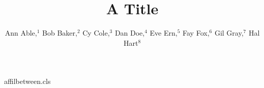 \begin{filecontents*}[overwrite]{affilbetween.cls}
\def\affilfont{\small}
\def\affil#1{\par{\reset@font\affilfont#1\par}}
\def\@maketitle{\newpage{\Large\bfseries\@title\par}\vskip1em\noindent{\bfseries\@author\par}\vskip1em}
\end{filecontents*}
\documentclass{affilbetween}

\title{A Title}
\author{Ann Able,$^1$ Bob Baker,$^2$ Cy Cole,$^3$ Dan Doe,$^4$ Eve Ern,$^5$ Fay Fox,$^6$ Gil Gray,$^7$ Hal Hart$^8$
}
\maketitle
Body.

